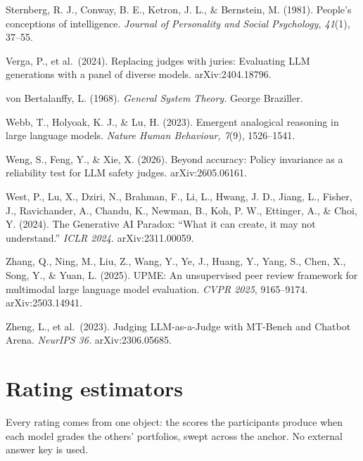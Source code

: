 \documentclass{article}
\begin{document}
Sternberg, R. J., Conway, B. E., Ketron, J. L., \& Bernstein, M. (1981). People's conceptions of intelligence. \emph{Journal of Personality and Social Psychology, 41}(1), 37--55.

Verga, P., et al.~(2024). Replacing judges with juries: Evaluating LLM generations with a panel of diverse models. arXiv:2404.18796.

von Bertalanffy, L. (1968). \emph{General System Theory.} George Braziller.

Webb, T., Holyoak, K. J., \& Lu, H. (2023). Emergent analogical reasoning in large language models. \emph{Nature Human Behaviour, 7}(9), 1526--1541.

Weng, S., Feng, Y., \& Xie, X. (2026). Beyond accuracy: Policy invariance as a reliability test for LLM safety judges. arXiv:2605.06161.

West, P., Lu, X., Dziri, N., Brahman, F., Li, L., Hwang, J. D., Jiang, L., Fisher, J., Ravichander, A., Chandu, K., Newman, B., Koh, P. W., Ettinger, A., \& Choi, Y. (2024). The Generative AI Paradox: ``What it can create, it may not understand.'' \emph{ICLR 2024.} arXiv:2311.00059.

Zhang, Q., Ning, M., Liu, Z., Wang, Y., Ye, J., Huang, Y., Yang, S., Chen, X., Song, Y., \& Yuan, L. (2025). UPME: An unsupervised peer review framework for multimodal large language model evaluation. \emph{CVPR 2025}, 9165--9174. arXiv:2503.14941.

Zheng, L., et al.~(2023). Judging LLM-as-a-Judge with MT-Bench and Chatbot Arena. \emph{NeurIPS 36.} arXiv:2306.05685.

\endgroup
\clearpage
\appendix

\section{Rating estimators}\label{rating-estimators}

Every rating comes from one object: the scores the participants produce when each model grades the others' portfolios, swept across the anchor. No external answer key is used.
\end{document}
